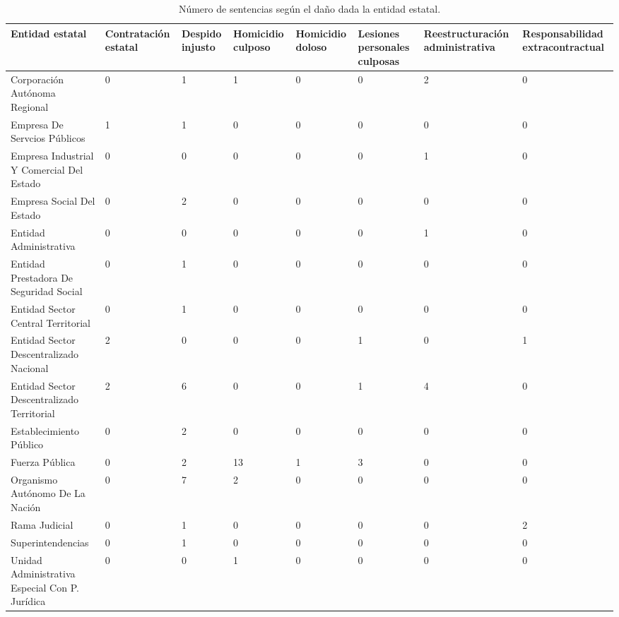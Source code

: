 \begin{sidewaystable}[!htbp]
\centering
\caption{Número de sentencias según el daño dada la entidad estatal.} 
\label{tab:entidaddano}
\begin{tabular}{lR{2cm}R{2cm}R{2cm}R{2cm}R{2cm}R{2cm}R{2cm}}
  \hline
Entidad estatal & Contratación estatal & Despido injusto & Homicidio culposo & Homicidio doloso & Lesiones personales culposas & Reestructuración administrativa & Responsabilidad extracontractual \\ 
  \hline
Corporación Autónoma Regional &  0 &  1 &  1 &  0 &  0 &  2 &  0 \\ 
  Empresa De Servcios Públicos &  1 &  1 &  0 &  0 &  0 &  0 &  0 \\ 
  Empresa Industrial Y Comercial Del Estado &  0 &  0 &  0 &  0 &  0 &  1 &  0 \\ 
  Empresa Social Del Estado &  0 &  2 &  0 &  0 &  0 &  0 &  0 \\ 
  Entidad Administrativa &  0 &  0 &  0 &  0 &  0 &  1 &  0 \\ 
  Entidad Prestadora De Seguridad Social &  0 &  1 &  0 &  0 &  0 &  0 &  0 \\ 
  Entidad Sector Central Territorial &  0 &  1 &  0 &  0 &  0 &  0 &  0 \\ 
  Entidad Sector Descentralizado Nacional &  2 &  0 &  0 &  0 &  1 &  0 &  1 \\ 
  Entidad Sector Descentralizado Territorial &  2 &  6 &  0 &  0 &  1 &  4 &  0 \\ 
  Establecimiento Público &  0 &  2 &  0 &  0 &  0 &  0 &  0 \\ 
  Fuerza Pública &  0 &  2 & 13 &  1 &  3 &  0 &  0 \\ 
  Organismo Autónomo De La Nación &  0 &  7 &  2 &  0 &  0 &  0 &  0 \\ 
  Rama Judicial &  0 &  1 &  0 &  0 &  0 &  0 &  2 \\ 
  Superintendencias &  0 &  1 &  0 &  0 &  0 &  0 &  0 \\ 
  Unidad Administrativa Especial Con P. Jurídica &  0 &  0 &  1 &  0 &  0 &  0 &  0 \\ 
   \hline
\end{tabular}
\end{sidewaystable}
